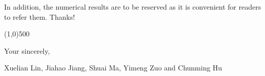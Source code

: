 \documentclass{letter}
\begin{document}
In addition, the numerical results are to be reserved as it is convenient for readers to refer them. Thanks!


\line(1,0){500}



Your sincerely,

Xuelian Lin, Jiahao Jiang, Shuai Ma, Yimeng Zuo and Chunming Hu



%
%
\end{document}
